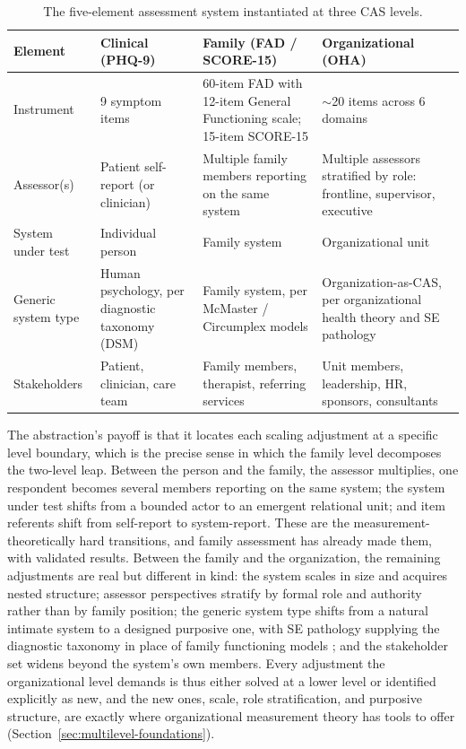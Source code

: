 \documentclass[12pt, letterpaper]{article}
\begin{document}
\begin{table}[htbp]
\centering
\small
\caption{The five-element assessment system instantiated at three CAS levels.}
\label{tab:assessment-system}
\begin{tabular}{p{2.6cm}p{3.4cm}p{3.7cm}p{4.0cm}}
\toprule
Element & Clinical (PHQ-9) & Family (FAD / SCORE-15) & Organizational (OHA) \\
\midrule
Instrument & 9 symptom items & 60-item FAD with 12-item General Functioning scale; 15-item SCORE-15 & $\sim$20 items across 6 domains \\
\midrule
Assessor(s) & Patient self-report (or clinician) & Multiple family members reporting on the same system & Multiple assessors stratified by role: frontline, supervisor, executive \\
\midrule
System under test & Individual person & Family system & Organizational unit \\
\midrule
Generic system type & Human psychology, per diagnostic taxonomy (DSM) & Family system, per McMaster / Circumplex models & Organization-as-CAS, per organizational health theory and SE pathology \\
\midrule
Stakeholders & Patient, clinician, care team & Family members, therapist, referring services & Unit members, leadership, HR, sponsors, consultants \\
\bottomrule
\end{tabular}
\end{table}

The abstraction's payoff is that it locates each scaling adjustment at a specific level boundary, which is the precise sense in which the family level decomposes the two-level leap. Between the person and the family, the assessor multiplies, one respondent becomes several members reporting on the same system; the system under test shifts from a bounded actor to an emergent relational unit; and item referents shift from self-report to system-report. These are the measurement-theoretically hard transitions, and family assessment has already made them, with validated results. Between the family and the organization, the remaining adjustments are real but different in kind: the system scales in size and acquires nested structure; assessor perspectives stratify by formal role and authority rather than by family position; the generic system type shifts from a natural intimate system to a designed purposive one, with SE pathology supplying the diagnostic taxonomy in place of family functioning models \parencite{davidz2018}; and the stakeholder set widens beyond the system's own members. Every adjustment the organizational level demands is thus either solved at a lower level or identified explicitly as new, and the new ones, scale, role stratification, and purposive structure, are exactly where organizational measurement theory has tools to offer (Section~\ref{sec:multilevel-foundations}).
\end{document}

